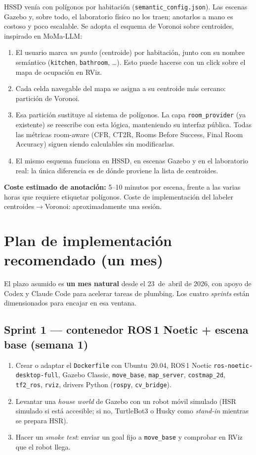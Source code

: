 \documentclass[11pt,a4paper]{article}
\begin{document}
HSSD venía con polígonos por habitación (\texttt{semantic\_config.json}). Las
escenas Gazebo y, sobre todo, el laboratorio físico no los traen; anotarlos a
mano es costoso y poco escalable. Se adopta el esquema de Voronoi sobre
centroides, inspirado en MoMa-LLM:

\begin{enumerate}
  \item El usuario marca \emph{un punto} (centroide) por habitación, junto con
        su nombre semántico (\texttt{kitchen}, \texttt{bathroom}, \ldots).
        Esto puede hacerse con un click sobre el mapa de ocupación en RViz.
  \item Cada celda navegable del mapa se asigna a su centroide más cercano:
        partición de Voronoi.
  \item Esa partición sustituye al sistema de polígonos. La capa
        \texttt{room\_provider} (ya existente) se reescribe con esta lógica,
        manteniendo su interfaz pública. Todas las métricas room-aware
        (CFR, CT2R, Rooms Before Success, Final Room Accuracy) siguen siendo
        calculables sin modificarlas.
  \item El mismo esquema funciona en HSSD, en escenas Gazebo y en el laboratorio
        real: la única diferencia es de dónde proviene la lista de centroides.
\end{enumerate}

\textbf{Coste estimado de anotación:} 5--10 minutos por escena, frente a las
varias horas que requiere etiquetar polígonos. Coste de implementación del
labeler centroides$\rightarrow$Voronoi: aproximadamente una sesión.

\section{Plan de implementación recomendado (un mes)}

El plazo asumido es \textbf{un mes natural} desde el 23~de~abril de 2026,
con apoyo de Codex y Claude Code para acelerar tareas de plumbing. Los cuatro
\emph{sprints} están dimensionados para encajar en esa ventana.

\subsection*{Sprint 1 --- contenedor ROS\,1 Noetic + escena base (semana 1)}
\begin{enumerate}
  \item Crear o adaptar el \texttt{Dockerfile} con Ubuntu~20.04, ROS\,1 Noetic
        \texttt{ros-noetic-desktop-full}, Gazebo Classic, \texttt{move\_base},
        \texttt{map\_server}, \texttt{costmap\_2d}, \texttt{tf2\_ros},
        \texttt{rviz}, drivers Python (\texttt{rospy}, \texttt{cv\_bridge}).
  \item Levantar una \emph{house world} de Gazebo con un robot móvil simulado
        (HSR simulado si está accesible; si no, TurtleBot3 o Husky como
        \emph{stand-in} mientras se prepara HSR).
  \item Hacer un \emph{smoke test}: enviar un goal fijo a \texttt{move\_base} y
        comprobar en RViz que el robot llega.
\end{enumerate}
\end{document}

